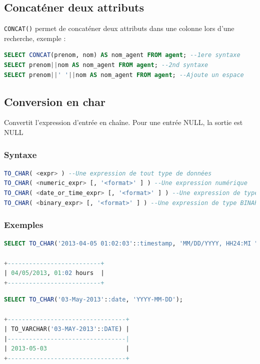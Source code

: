 \subsection{Concaténer deux attributs}
\texttt{CONCAT()} permet de concaténer deux attributs dans une colonne lors d'une recherche, exemple :
\begin{lstlisting}[language=SQL]
SELECT CONCAT(prenom, nom) AS nom_agent FROM agent; --1ere syntaxe
SELECT prenom||nom AS nom_agent FROM agent; --2nd syntaxe
SELECT prenom||' '||nom AS nom_agent FROM agent; --Ajoute un espace
\end{lstlisting}

\subsection{Conversion en char}
Convertit l’expression d’entrée en chaîne. Pour une entrée NULL, la sortie est NULL

\subsubsection{Syntaxe}
\begin{lstlisting}[language=SQL]
TO_CHAR( <expr> ) --Une expression de tout type de données
TO_CHAR( <numeric_expr> [, '<format>' ] ) --Une expression numérique
TO_CHAR( <date_or_time_expr> [, '<format>' ] ) --Une expression de type DATE, TIME ou TIMESTAMP
TO_CHAR( <binary_expr> [, '<format>' ] ) --Une expression de type BINARY ou VARBINARY
\end{lstlisting}

\subsubsection{Exemples}
\begin{lstlisting}[language=SQL]
SELECT TO_CHAR('2013-04-05 01:02:03'::timestamp, 'MM/DD/YYYY, HH24:MI "hours"');

+--------------------------+
| 04/05/2013, 01:02 hours  |
+--------------------------+
\end{lstlisting}

\begin{lstlisting}[language=SQL]
SELECT TO_CHAR('03-May-2013'::date, 'YYYY-MM-DD');

+---------------------------------+
| TO_VARCHAR('03-MAY-2013'::DATE) |
|---------------------------------|
| 2013-05-03                      |
+---------------------------------+
\end{lstlisting}

